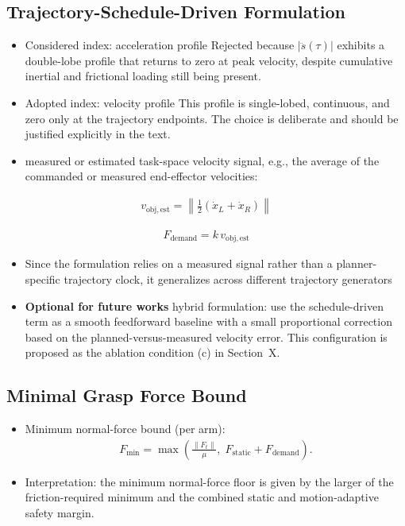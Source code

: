 \documentclass[conference]{IEEEtran}
\begin{document}
\subsection{Trajectory-Schedule-Driven Formulation}
\begin{itemize}

    \item Considered index: acceleration profile Rejected because \(|\ddot{s}(\tau)|\) exhibits a double-lobe profile that returns to zero at peak velocity, despite cumulative inertial and frictional loading still being present.

    \item Adopted index: velocity profile This profile is single-lobed, continuous, and zero only at the trajectory endpoints. The choice is deliberate and should be justified explicitly in the text.

    \item measured or estimated task-space velocity signal, e.g., the average of the commanded or measured end-effector velocities:
\end{itemize}    
    \begin{align}
        v_{\mathrm{obj,est}}=\left\|\frac{1}{2}\left(\dot{x}_{L} + \dot{x}_{R}\right)\right\|
    \end{align}

    \begin{align}
        F_{\mathrm{demand}}=k\,v_{\mathrm{obj,est}}
    \end{align}
\begin{itemize}
    \item Since the formulation relies on a measured signal rather than a planner-specific trajectory clock, it generalizes across different trajectory generators
    \item \textbf{Optional for future works} hybrid formulation: use the schedule-driven term as a smooth feedforward baseline with a small proportional correction based on the planned-versus-measured velocity error. This configuration is proposed as the ablation condition (c) in Section~X.
\end{itemize}

\subsection{Minimal Grasp Force Bound}
\begin{itemize}
    \item Minimum normal-force bound (per arm):
    \begin{align}
        F_{\mathrm{min}}
        =
        \max\left(
        \frac{\lVert F_t \rVert}{\mu},
        \;
        F_{\mathrm{static}} + F_{\mathrm{demand}}
        \right).
    \end{align}

    \item Interpretation: the minimum normal-force floor is given by the larger of the friction-required minimum and the combined static and motion-adaptive safety margin.
\end{itemize}
\end{document}
